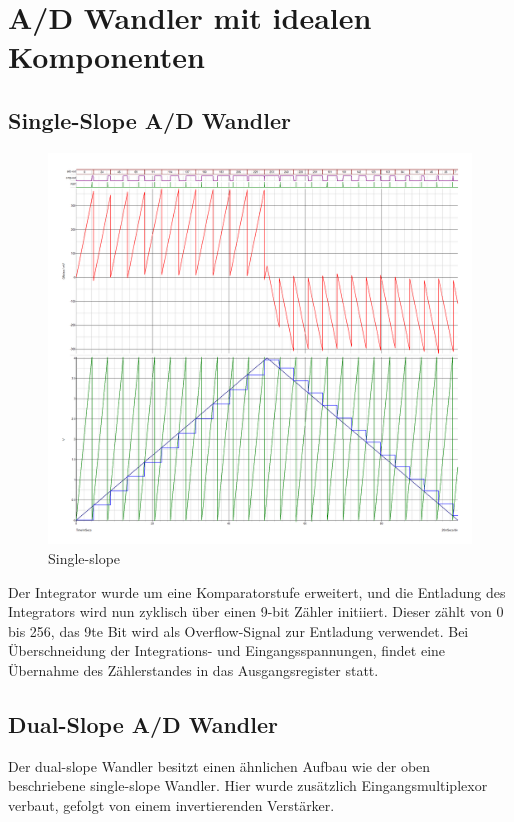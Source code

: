 \documentclass[
	ngerman,
	parskip=half,
	headsepline,
	fontsize=12pt,
	DIV=13,
	listof=leveldown,
	]{scrreprt}
\begin{document}
		\section{A/D Wandler mit idealen Komponenten}
		
		\subsection{Single-Slope A/D Wandler}
		
		\begin{figure}[!h]
			\centering
			\includegraphics[width=\linewidth]{single_slope_adc_ideal_opamp}
			\caption{Single-slope}
			\label{fig:single-slope-ideal}
		\end{figure}
	
		Der Integrator wurde um eine Komparatorstufe erweitert, und die Entladung des Integrators wird nun zyklisch über einen 9-bit Zähler initiiert. Dieser zählt von 0 bis 256, das 9te Bit wird als Overflow-Signal zur Entladung verwendet.
		Bei Überschneidung der Integrations- und Eingangsspannungen, findet eine Übernahme des Zählerstandes in das Ausgangsregister statt.
		
		
		\subsection{Dual-Slope A/D Wandler}
		
		Der dual-slope Wandler besitzt einen ähnlichen Aufbau wie der oben beschriebene single-slope Wandler. Hier wurde zusätzlich Eingangsmultiplexor verbaut, gefolgt von einem invertierenden Verstärker. 
		
\end{document}
